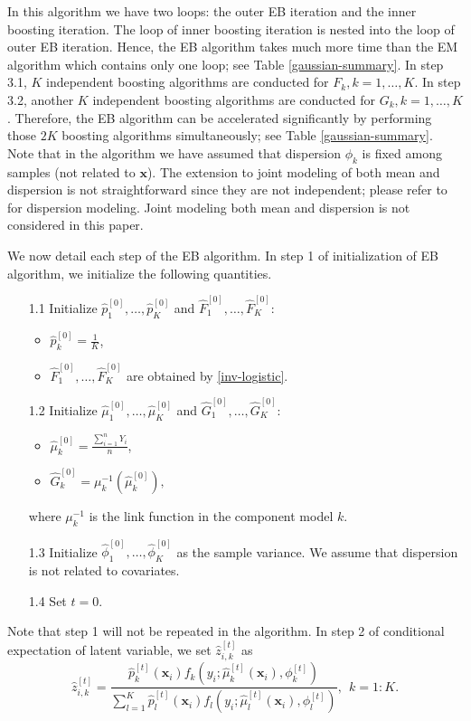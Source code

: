 \documentclass[11pt]{article}
\numberwithin{equation}{section}
\def\bx{\boldsymbol{x}}
\begin{document}
In this algorithm we have two loops: the outer EB iteration and the inner boosting iteration.
The loop of inner boosting iteration is nested into the loop of outer EB iteration.
Hence, the EB algorithm takes much more time than the EM algorithm which contains only one loop; see Table \ref{gaussian-summary}.
In step 3.1, $K$ independent boosting algorithms are conducted for $F_k, k=1,\ldots,K$.
In step 3.2,  another $K$ independent boosting algorithms are conducted for $G_k, k=1,\ldots,K$.
Therefore, the EB algorithm can be accelerated significantly by performing those $2K$ boosting algorithms simultaneously; see Table \ref{gaussian-summary}.  
Note that  in the algorithm we have assumed that dispersion $\phi_k$ is fixed among samples (not related to $\bx$). The extension to joint modeling of both mean and dispersion  is not straightforward since they are not independent; please refer to \citet{jorgensen:1997} for dispersion modeling.
Joint modeling both mean and dispersion is not considered in this paper.

We now detail each step of the EB algorithm.	
In step 1 of initialization of EB algorithm, we initialize the following quantities.
	\begin{enumerate}
		\item[1.1] Initialize $\hat{p}_1^{[0]}, \ldots,\hat{p}_K^{[0]}$ and   $\hat{F}_1^{[0]}, \ldots, \hat{F}_{K}^{[0]}$:
		
		\begin{itemize}
			\item 	$\hat{p}_k^{[0]}=\frac{1}{K}$,
			\item $\hat{F}_1^{[0]}, \ldots, \hat{F}_{K}^{[0]}$ are obtained by \eqref{inv-logistic}.
		\end{itemize}
		\item[1.2]
		Initialize $\hat{\mu}_1^{[0]},\ldots,\hat{\mu}_K^{[0]}$ and  $\hat{G}_1^{[0]},\ldots,\hat{G}_K^{[0]}$:
		\begin{itemize}
			\item $\hat{\mu}_k^{[0]}=\frac{\sum_{i=1}^nY_i}{n}$,
			\item $\hat{G}_k^{[0]}=\mu_k^{-1}(\hat{\mu}_k^{[0]}),$
		\end{itemize}
	where $\mu^{-1}_k$ is the link function in the component model $k$.
		\item[1.3] Initialize $\hat{\phi}_1^{[0]},\ldots, \hat{\phi}_K^{[0]}$ as the sample variance. We assume that dispersion is not related to covariates.
		\item[1.4] 	Set $t=0$.
	\end{enumerate}
Note that step 1 will not be repeated in the algorithm.	
In step 2 of conditional expectation of latent variable, we set  $\hat{z}_{i,k}^{[t]}$ as
	\begin{equation*}
		\hat{z}_{i,k}^{[t]}=\frac{\hat{p}_{k}^{[t]}(\bx_i) f_{k}\left(y_i ; \hat{\mu}_{k}^{[t]}(\bx_i), \phi_k^{[t]} \right)}{\sum_{l=1}^{K} \hat{p}_{l}^{[t]}(\bx_i) f_{l}\left(y_i ; \hat{\mu}_{l}^{[t]}(\bx_i), \phi_l^{[t]}\right)},~~ k=1:K.
	\end{equation*}
\end{document}
